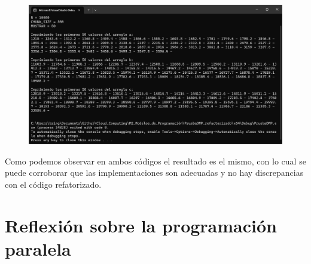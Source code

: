 \documentclass[12pt,a4paper]{article}
\begin{document}
\begin{figure}[H]
    \centering
    \includegraphics[width=1\linewidth]{M2_Modelos_de_Programación/reporte/figuras/Código_refactorizado_resultados.png}
    \label{fig:Código_refactorizado_resultados}
\end{figure}

Como podemos observar en ambos códigos el resultado es el mismo, con lo cual se puede corroborar que las implementaciones son adecuadas y no hay discrepancias con el código refatorizado.


\section{Reflexión sobre la programación paralela}
\end{document}
